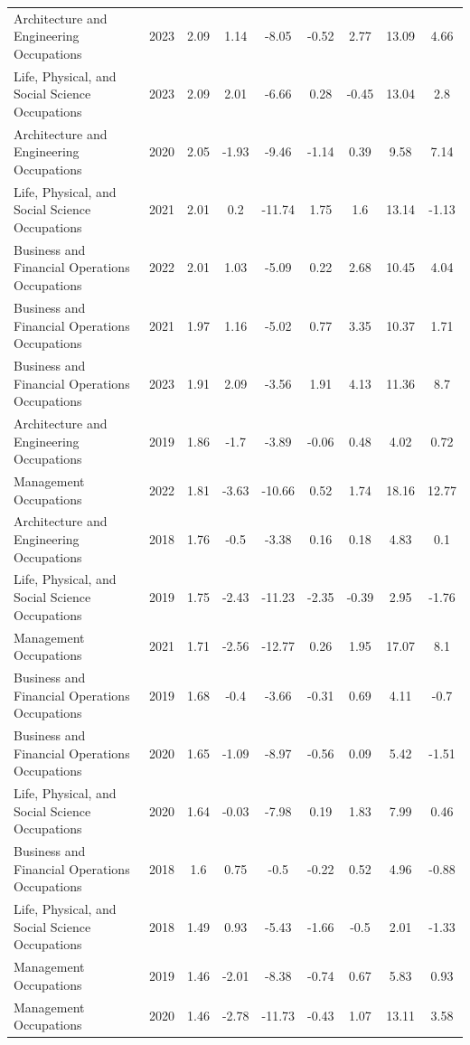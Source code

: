 \begin{table}[htbp]
\begin{tabular}{lcccccccc}
Architecture and Engineering Occupations & 2023 & 2.09 & 1.14 & -8.05 & -0.52 & 2.77 & 13.09 & 4.66 \\
Life, Physical, and Social Science Occupations & 2023 & 2.09 & 2.01 & -6.66 & 0.28 & -0.45 & 13.04 & 2.8 \\
Architecture and Engineering Occupations & 2020 & 2.05 & -1.93 & -9.46 & -1.14 & 0.39 & 9.58 & 7.14 \\
Life, Physical, and Social Science Occupations & 2021 & 2.01 & 0.2 & -11.74 & 1.75 & 1.6 & 13.14 & -1.13 \\
Business and Financial Operations Occupations & 2022 & 2.01 & 1.03 & -5.09 & 0.22 & 2.68 & 10.45 & 4.04 \\
Business and Financial Operations Occupations & 2021 & 1.97 & 1.16 & -5.02 & 0.77 & 3.35 & 10.37 & 1.71 \\
Business and Financial Operations Occupations & 2023 & 1.91 & 2.09 & -3.56 & 1.91 & 4.13 & 11.36 & 8.7 \\
Architecture and Engineering Occupations & 2019 & 1.86 & -1.7 & -3.89 & -0.06 & 0.48 & 4.02 & 0.72 \\
Management Occupations & 2022 & 1.81 & -3.63 & -10.66 & 0.52 & 1.74 & 18.16 & 12.77 \\
Architecture and Engineering Occupations & 2018 & 1.76 & -0.5 & -3.38 & 0.16 & 0.18 & 4.83 & 0.1 \\
Life, Physical, and Social Science Occupations & 2019 & 1.75 & -2.43 & -11.23 & -2.35 & -0.39 & 2.95 & -1.76 \\
Management Occupations & 2021 & 1.71 & -2.56 & -12.77 & 0.26 & 1.95 & 17.07 & 8.1 \\
Business and Financial Operations Occupations & 2019 & 1.68 & -0.4 & -3.66 & -0.31 & 0.69 & 4.11 & -0.7 \\
Business and Financial Operations Occupations & 2020 & 1.65 & -1.09 & -8.97 & -0.56 & 0.09 & 5.42 & -1.51 \\
Life, Physical, and Social Science Occupations & 2020 & 1.64 & -0.03 & -7.98 & 0.19 & 1.83 & 7.99 & 0.46 \\
Business and Financial Operations Occupations & 2018 & 1.6 & 0.75 & -0.5 & -0.22 & 0.52 & 4.96 & -0.88 \\
Life, Physical, and Social Science Occupations & 2018 & 1.49 & 0.93 & -5.43 & -1.66 & -0.5 & 2.01 & -1.33 \\
Management Occupations & 2019 & 1.46 & -2.01 & -8.38 & -0.74 & 0.67 & 5.83 & 0.93 \\
Management Occupations & 2020 & 1.46 & -2.78 & -11.73 & -0.43 & 1.07 & 13.11 & 3.58 \\

\end{tabular}
\end{table}
